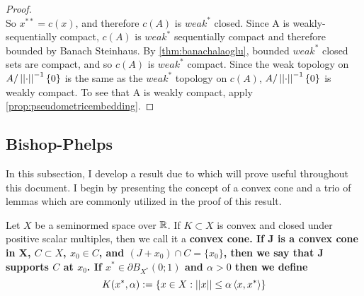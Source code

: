 \begin{thm}
\begin{proof}
\begin{equation}
        \end{equation}
        So $x^{**}=c(x)$, and therefore $c(A)$ is $weak^*$ closed. Since A is weakly-sequentially compact, $c(A)$ is $weak^*$ sequentially compact and therefore bounded by Banach Steinhaus. 
        By \ref{thm:banachalaoglu}, bounded $weak^*$ closed sets are compact, and so $c(A)$ is $weak^*$ compact. 
        Since the weak topology on $A/\left|\left| \cdot \right|\right|^{-1}\{0\}$  is the same as the $weak^*$ topology on $c(A)$, $A / \left|\left| \cdot \right|\right|^{-1}\{0\}$ is weakly compact. 
        To see that A is weakly compact, apply \ref{prop:pseudometricembedding}.
    \end{proof} 
\end{thm} 

\subsection{Bishop-Phelps}
In this subsection, I develop a result due to \cite{bishopphelps63} which will prove useful throughout this document.
I begin by presenting the concept of a convex cone and a trio of lemmas which are commonly utilized in the proof of this result. 
\begin{df} \rm
    \label{df:ConvexCone}
    Let $X$ be a seminormed space over $\mathbb{R}$. If $K \subset X$ is convex and closed under positive scalar multiples, then we call it a \bf convex cone\rm. If J is a convex cone in X, $C \subset X$, $x_0 \in C$, and $(J+x_0) \cap C = \{x_0\}$, then we say that J \bf supports \rm $C$ at $x_0$. If $x^* \in \partial B_{X^*}(0;1)$ and $\alpha >0$ then we define 
    \begin{equation}
        K(x^*,\alpha):=\{x \in X: ||x|| \leq \alpha \left\langle x,x^* \right\rangle\}
    \end{equation}
\end{df} 

